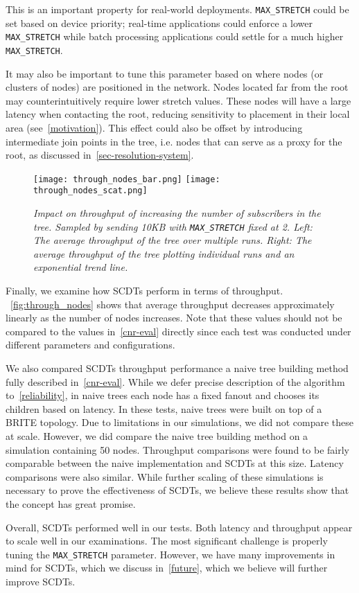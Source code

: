 This is an important property for real-world deployments. \texttt{MAX\_STRETCH} could be set based on device priority; real-time applications could enforce a lower \texttt{MAX\_STRETCH} while batch processing applications could settle for a much higher \texttt{MAX\_STRETCH}.  

It may also be important to tune this parameter based on where nodes (or clusters of nodes) are positioned in the network. Nodes located far from the root may counterintuitively require lower stretch values. These nodes will have a large latency when contacting the root, reducing sensitivity to placement in their local area (see~\autoref{motivation}). This effect could also be offset by introducing intermediate join points in the tree, i.e. nodes that can serve as a proxy for the root, as discussed in~\autoref{sec-resolution-system}.
	
\begin{figure}[h]
	\begin{center}
		\texttt{[image: through\_nodes\_bar.png]}
		\texttt{[image: through\_nodes\_scat.png]}
	\end{center}
	\vspace{-1.3em}
	\caption{\small \itshape Impact on throughput of increasing the number of subscribers in the tree. Sampled by sending 10KB with \texttt{MAX\_STRETCH} fixed at 2. Left: The average throughput of the tree over multiple runs. Right: The average throughput of the tree plotting individual runs and an exponential trend line.}
	\vspace{-1em}
	\label{fig:through_nodes}
\end{figure}

Finally, we examine how SCDTs perform in terms of throughput. ~\autoref{fig:through_nodes} shows that average throughput decreases approximately linearly as the number of nodes increases. Note that these values should not be compared to the values in~\autoref{cnr-eval} directly since each test was conducted under different parameters and configurations.  

We also compared SCDTs throughput performance a naive tree building method fully described in~\autoref{cnr-eval}. While we defer precise description of the algorithm to~\autoref{reliability}, in naive trees each node has a fixed fanout and chooses its children based on latency.  In these tests, naive trees were built on top of a BRITE topology. Due to limitations in our simulations, we did not compare these at scale. However, we did compare the naive tree building method on a simulation containing 50 nodes. Throughput comparisons were found to be fairly comparable between the naive implementation and SCDTs at this size.  Latency comparisons were also similar.  While further scaling of these simulations is necessary to prove the effectiveness of SCDTs, we believe these results show that the concept has great promise.

Overall, SCDTs performed well in our tests. Both latency and throughput appear to scale well in our examinations. The most significant challenge is properly tuning the \texttt{MAX\_STRETCH} parameter. However, we have many improvements in mind for SCDTs, which we discuss in~\autoref{future}, which we believe will further improve SCDTs. 